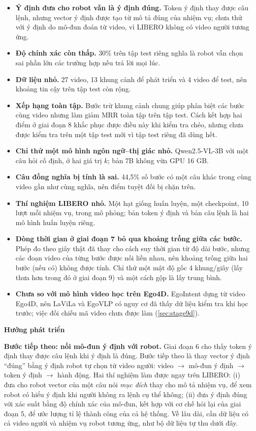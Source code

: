 \documentclass[a4paper,oneside]{report}
\newcommand{\mucnho}[1]{\par\vspace{4pt}\noindent\textbf{#1}\par\nobreak}
\begin{document}
\begin{itemize}
  \item \textbf{Ý định đưa cho robot vẫn là ý định đúng.} Token ý định thay được câu lệnh, nhưng vector ý định được tạo từ mô tả đúng của nhiệm vụ; chưa thử với ý định do mô-đun đoán từ video, vì LIBERO không có video người tương ứng.
  \item \textbf{Độ chính xác còn thấp.} 30\% trên tập test riêng nghĩa là robot vẫn chọn sai phần lớn các trường hợp nếu trả lời mọi lúc.
  \item \textbf{Dữ liệu nhỏ.} 27 video, 13 khung cảnh để phát triển và 4 video để test, nên khoảng tin cậy trên tập test còn rộng.
  \item \textbf{Xếp hạng toàn tập.} Bước trừ khung cảnh chung giúp phân biệt các bước cùng video nhưng làm giảm MRR toàn tập trên tập test. Cách kết hợp hai điểm ở giai đoạn 8 khắc phục được điều này khi kiểm tra chéo, nhưng chưa được kiểm tra trên một tập test mới vì tập test riêng đã dùng hết.
  \item \textbf{Chỉ thử một mô hình ngôn ngữ--thị giác nhỏ.} Qwen2.5-VL-3B với một câu hỏi cố định, ở hai giá trị $k$; bản 7B không vừa GPU 16 GB.
  \item \textbf{Câu đồng nghĩa bị tính là sai.} 44,5\% số bước có một câu khác trong cùng video gần như cùng nghĩa, nên điểm tuyệt đối bị chặn trên.
  \item \textbf{Thí nghiệm LIBERO nhỏ.} Một hạt giống huấn luyện, một checkpoint, 10 lượt mỗi nhiệm vụ, trong mô phỏng; bản token ý định và bản câu lệnh là hai mô hình huấn luyện riêng.
  \item \textbf{Dòng thời gian ở giai đoạn 7 bỏ qua khoảng trống giữa các bước.} Phép đo theo giây thật đã thay cho cách suy thời gian từ độ dài bước, nhưng các đoạn video của từng bước được nối liền nhau, nên khoảng trống giữa hai bước (nếu có) không được tính. Chỉ thử một mật độ gốc 4 khung/giây (lấy thưa hơn trong đó ở giai đoạn 9) và một cách gộp là lấy trung bình.
  \item \textbf{Chưa so với mô hình video học trên Ego4D.} EgoIntent dựng từ video Ego4D, nên LaViLa và EgoVLP có nguy cơ đã thấy dữ liệu kiểm tra khi học trước; việc đối chiếu mã video chưa được làm (\cref{sec:stage9d}).
\end{itemize}

\mucnho{Hướng phát triển}
\label{sec:future}

\textbf{Bước tiếp theo: nối mô-đun ý định với robot.} Giai đoạn 6 cho thấy token ý định thay được câu lệnh khi ý định là đúng. Bước tiếp theo là thay vector ý định ``đúng'' bằng ý định robot tự chọn từ video người: video $\rightarrow$ mô-đun ý định $\rightarrow$ token ý định $\rightarrow$ hành động. Hai thí nghiệm làm được ngay trên LIBERO: (i) đưa cho robot vector của một câu nói \textit{mục đích} thay cho mô tả nhiệm vụ, để xem robot có hiểu ý định khi người không ra lệnh cụ thể không; (ii) đưa ý định đúng với xác suất bằng độ chính xác của mô-đun, kết hợp với cơ chế hỏi lại của giai đoạn 5, để ước lượng tỉ lệ thành công của cả hệ thống. Về lâu dài, cần dữ liệu có cả video người và nhiệm vụ robot tương ứng, như bộ dữ liệu tự thu dưới đây.
\end{document}
